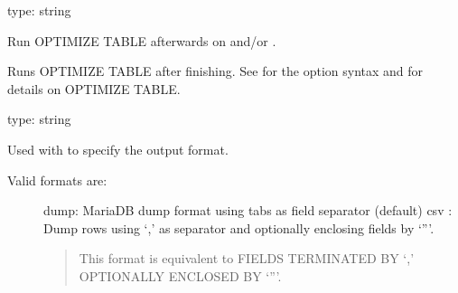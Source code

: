 \documentclass[letterpaper,10pt,english]{sphinxmanual}
\begin{document}
\begin{fulllineitems}
\label{\detokenize{mariadb-archiver:cmdoption-mariadb-archiver-optimize}}
\sphinxAtStartPar
type: string

\sphinxAtStartPar
Run OPTIMIZE TABLE afterwards on {\hyperref[\detokenize{mariadb-archiver:cmdoption-mariadb-archiver-source}]{}} and/or {\hyperref[\detokenize{mariadb-archiver:cmdoption-mariadb-archiver-dest}]{}}.

\sphinxAtStartPar
Runs OPTIMIZE TABLE after finishing.  See {\hyperref[\detokenize{mariadb-archiver:cmdoption-mariadb-archiver-analyze}]{}} for the option syntax
and  for details on OPTIMIZE
TABLE.

\end{fulllineitems}


\begin{fulllineitems}
\label{\detokenize{mariadb-archiver:cmdoption-mariadb-archiver-output-format}}
\sphinxAtStartPar
type: string

\sphinxAtStartPar
Used with {\hyperref[\detokenize{mariadb-archiver:cmdoption-mariadb-archiver-file}]{}} to specify the output format.
\begin{description}
\item[{Valid formats are:}] \leavevmode
\sphinxAtStartPar
dump: MariaDB dump format using tabs as field separator (default)
csv : Dump rows using ‘,’ as separator and optionally enclosing fields by ‘”’.
\begin{quote}

\sphinxAtStartPar
This format is equivalent to FIELDS TERMINATED BY ‘,’ OPTIONALLY ENCLOSED BY ‘”’.
\end{quote}

\end{description}

\end{fulllineitems}
\end{document}
